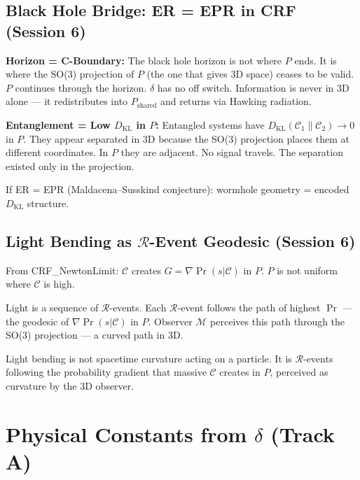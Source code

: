 \documentclass[12pt, a4paper]{article}
\begin{document}
\subsection{Black Hole Bridge: ER = EPR in CRF (Session 6)}

\textbf{Horizon = C-Boundary:} The black hole horizon is not where $P$ ends. It is where
the SO(3) projection of $P$ (the one that gives 3D space) ceases to be valid. $P$ continues
through the horizon. $\delta$ has no off switch. Information is never in 3D alone --- it
redistributes into $P_{\mathrm{shared}}$ and returns via Hawking radiation.

\textbf{Entanglement = Low $D_{\mathrm{KL}}$ in $P$:} Entangled systems have
$D_{\mathrm{KL}}(\mathcal{C}_1\|\mathcal{C}_2) \to 0$ in $P$. They appear separated in
3D because the SO(3) projection places them at different coordinates. In $P$ they are
adjacent. No signal travels. The separation existed only in the projection.

If ER = EPR (Maldacena--Susskind conjecture): wormhole geometry = encoded $D_{\mathrm{KL}}$
structure.

\subsection{Light Bending as $\mathcal{R}$-Event Geodesic (Session 6)}

\begin{derivedbox}[title={Light Bending from R-Event Geodesics}]
From CRF\_NewtonLimit: $\mathcal{C}$ creates $G = \nabla\Pr(s|\mathcal{C})$ in $P$.
$P$ is not uniform where $\mathcal{C}$ is high.

Light is a sequence of $\mathcal{R}$-events. Each $\mathcal{R}$-event follows the path
of highest $\Pr$ --- the geodesic of $\nabla\Pr(s|\mathcal{C})$ in $P$. Observer
$\mathcal{M}$ perceives this path through the SO(3) projection --- a curved path in 3D.

Light bending is not spacetime curvature acting on a particle. It is $\mathcal{R}$-events
following the probability gradient that massive $\mathcal{C}$ creates in $P$, perceived
as curvature by the 3D observer.
\end{derivedbox}

\section{Physical Constants from $\delta$ (Track A)}
\end{document}
